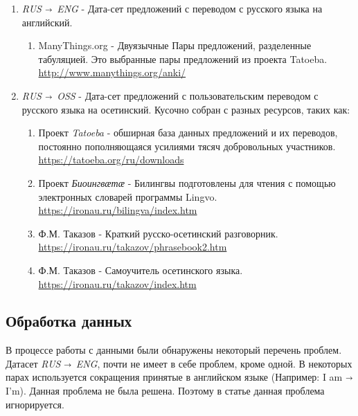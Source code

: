 	\begin{enumerate}
		\item \textit{RUS $\shortrightarrow$ ENG} - Дата-сет предложений с переводом с русского языка на английский.
		\begin{enumerate}
			\item ManyThings.org - Двуязычные Пары предложений, разделенные табуляцией. 
			Это выбранные пары предложений из проекта Tatoeba. \\ 
			\url{http://www.manythings.org/anki/}
		\end{enumerate}
		\item \textit{RUS $\shortrightarrow$ OSS} - Дата-сет предложений с пользовательским переводом с русского языка на осетинский.
		Кусочно собран с разных ресурсов, таких как:
		\begin{enumerate}
			 \item Проект \textit{Tatoeba} - обширная база данных предложений и их переводов, постоянно пополняющаяся усилиями тясяч добровольных участников. \\ \url{https://tatoeba.org/ru/downloads}
			 \item Проект \textit{Биоингвӕтӕ} - Билингвы подготовлены для чтения с помощью электронных словарей программы Lingvo. \\ \url{https://ironau.ru/bilingva/index.htm}
			 \item Ф.М. Таказов - Краткий русско-осетинский разговорник. \\ \url{https://ironau.ru/takazov/phrasebook2.htm}
			 \item Ф.М. Таказов - Самоучитель осетинского языка. \\ \url{https://ironau.ru/takazov/index.htm}
 		\end{enumerate}
	\end{enumerate}
	
	\clearpage
	
	\subsection{Обработка данных}
	
	В процессе работы с данными были обнаружены некоторый перечень проблем. 
    Датасет \textit{RUS $\shortrightarrow$ ENG}, почти не имеет в себе проблем, кроме одной. В некоторых парах используется сокращения принятые в английском языке (Например: I am $\shortrightarrow$ I'm). Данная проблема не была решена. Поэтому в статье данная проблема игнорируется.
    

